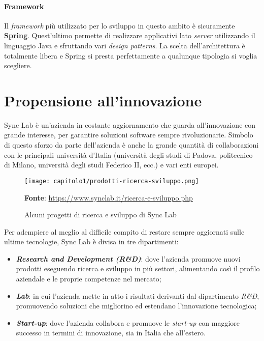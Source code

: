 \paragraph{Framework}
Il \emph{framework} più utilizzato per lo sviluppo in questo ambito è sicuramente \textbf{Spring}. Quest'ultimo permette di realizzare applicativi lato \emph{server} utilizzando il linguaggio Java e sfruttando vari \emph{design patterns}. La scelta dell'architettura è totalmente libera e Spring si presta perfettamente a qualunque tipologia si voglia scegliere.

\section{Propensione all'innovazione}
Sync Lab è un'azienda in costante aggiornamento che guarda all'innovazione con grande interesse, per garantire soluzioni software sempre rivoluzionarie. Simbolo di questo sforzo da parte dell'azienda è anche la grande quantità di collaborazioni con le principali università d'Italia (università degli studi di Padova, politecnico di Milano, università degli studi Federico II, ecc.) e vari enti europei.\\

\begin{figure}[!h]
  \centering
  \texttt{[image: capitolo1/prodotti-ricerca-sviluppo.png]}
  \caption{Alcuni progetti di ricerca e sviluppo di Sync Lab}
  \textbf{Fonte}: \href{https://www.synclab.it/ricerca-e-sviluppo.php}{https://www.synclab.it/ricerca-e-sviluppo.php}
\end{figure}

Per adempiere al meglio al difficile compito di restare sempre aggiornati sulle ultime tecnologie, Sync Lab è divisa in tre dipartimenti:
\begin{itemize}
  \item \textbf{\emph{Research and Development (R\&D)}}: dove l'azienda promuove nuovi prodotti eseguendo ricerca e sviluppo in più settori, alimentando così il profilo aziendale e le proprie competenze nel mercato;
  \item \textbf{\emph{Lab}}: in cui l'azienda mette in atto i risultati derivanti dal dipartimento \emph{R\&D}, promuovendo soluzioni che migliorino ed estendano l'innovazione tecnologica;
  \item \textbf{\emph{Start-up}}: dove l'azienda collabora e promuove le \emph{start-up} con maggiore successo in termini di innovazione, sia in Italia che all'estero.
\end{itemize}  

